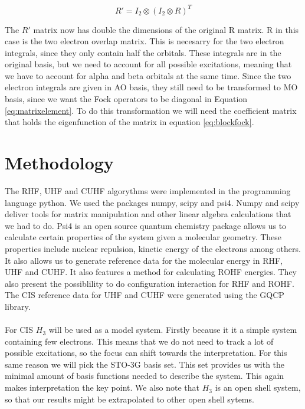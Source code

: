 \documentclass[twoside,twocolumn,9pt]{article}
\begin{document}
\begin{equation}\label{eq:kron}
  R' = I_2 \otimes (I_2 \otimes R)^T
\end{equation}

The $R'$ matrix now has double the dimensions of the original R matrix. R in this case is the two electron overlap matrix. This is necesarry for the two electron integrals, since 
they only contain half the orbitals. These integrals are in the original basis, but we need to account for all possible excitations, meaning that we have to account for alpha and 
beta orbitals at the same time. Since the two electron integrals are given in AO basis, they still need to be transformed to MO basis, since we want the Fock operators to be 
diagonal in Equation \eqref{eq:matrixelement}. To do this transformation we will need the coefficient matrix that holds the eigenfunction of the matrix in equation 
\eqref{eq:blockfock}.

\section{Methodology}
\label{sec:method}
The RHF, UHF and CUHF algorythms were implemented in the programming language python. We used the packages numpy, scipy and psi4. Numpy and scipy deliver tools for matrix manipulation
and other linear algebra calculations that we had to do. Psi4 is an open source quantum chemistry package allows us to calculate certain properties of the system given a molecular
geometry. These properties include nuclear repulsion, kinetic energy of the electrons among others. It also allows us to generate reference data for the molecular energy in RHF, UHF
and CUHF. It also features a method for calculating ROHF energies. They also present the possiblility to do configuration interaction for RHF and ROHF. The CIS reference data for
UHF and CUHF were generated using the GQCP library.
\paragraph*{}
For CIS $H_3$ will be used as a model system. Firstly because it it a simple system containing few electrons. This means that we do not need to track a lot of possible excitations, so
the focus can shift towards the interpretation. For this same reason we will pick the STO-3G basis set. This set provides us with the minimal amount of basis functions needed to
describe the system. This again makes interpretation the key point. We also note that $H_3$ is an open shell system, so that our results might be extrapolated to other open shell
sytems.
\end{document}
